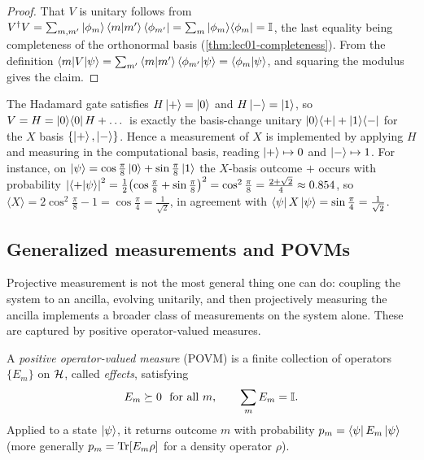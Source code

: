 \begin{proof}
That $V$ is unitary follows from
$V^{\dagger} V=\sum_{m,m'}\ket{\phi_{m}}\braket{m|m'}\bra{\phi_{m'}}=\sum_{m}\ket{\phi_{m}}\!\bra{\phi_{m}}=\mathbb{I}$,
the last equality being completeness of the orthonormal basis
(\cref{thm:lec01-completeness}). From the definition
$\braket{m|V|\psi}=\sum_{m'}\braket{m|m'}\braket{\phi_{m'}|\psi}=\braket{\phi_{m}|\psi}$,
and squaring the modulus gives the claim.
\end{proof}

\begin{example}\label{exa:lec01-xbasis}
The Hadamard gate satisfies $H\ket{+}=\ket{0}$ and $H\ket{-}=\ket{1}$, so
$V=H=\ket{0}\!\bra{0}H+\dots$ is exactly the basis-change unitary
$\ket{0}\!\bra{+}+\ket{1}\!\bra{-}$ for the $X$ basis $\{\ket{+},\ket{-}\}$. Hence a
measurement of $X$ is implemented by applying $H$ and measuring in the computational
basis, reading $\ket{+}\mapsto0$ and $\ket{-}\mapsto1$. For instance, on
$\ket{\psi}=\cos\tfrac{\pi}{8}\ket{0}+\sin\tfrac{\pi}{8}\ket{1}$ the $X$-basis outcome
$+$ occurs with probability
$\left\lvert \braket{+|\psi} \right\rvert^{2}=\tfrac12\bigl(\cos\tfrac{\pi}{8}+\sin\tfrac{\pi}{8}\bigr)^{2}
=\cos^{2}\tfrac{\pi}{8}=\tfrac{2+\sqrt2}{4}\approx0.854$, so
$\langle X\rangle=2\cos^{2}\tfrac{\pi}{8}-1=\cos\tfrac{\pi}{4}=\tfrac{1}{\sqrt2}$, in
agreement with $\bra{\psi}X\ket{\psi}=\sin\tfrac{\pi}{4}=\tfrac{1}{\sqrt2}$.
\end{example}

\subsection{Generalized measurements and POVMs}

Projective measurement is not the most general thing one can do: coupling the system
to an ancilla, evolving unitarily, and then projectively measuring the ancilla
implements a broader class of measurements on the system alone. These are captured by
positive operator-valued measures.

\begin{definition}[POVM]\label{def:lec01-povm}
A \emph{positive operator-valued measure} (POVM) is a finite collection of operators
$\{E_{m}\}$ on $\mathcal{H}$, called \emph{effects}, satisfying
\begin{equation}\label{eq:lec01-povm}
  E_{m}\succeq0\ \ \text{for all }m,\qquad \sum_{m}E_{m}=\mathbb{I}.
\end{equation}
Applied to a state $\ket{\psi}$, it returns outcome $m$ with probability
$p_{m}=\bra{\psi}E_{m}\ket{\psi}$ (more generally $p_{m}=\operatorname{Tr}[E_{m}\rho]$ for a density
operator $\rho$).
\end{definition}

